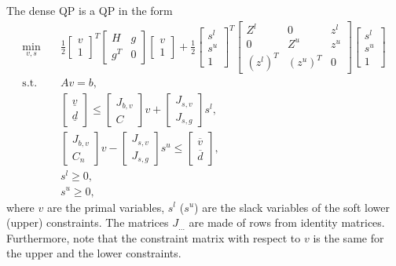 \documentclass[a4paper]{report}
\begin{document}
The dense QP is a QP in the form
\begin{align*}
\min_{v,s} & \quad \frac 1 2 \begin{bmatrix} v \\ 1 \end{bmatrix}^T \begin{bmatrix} H & g \\ g^T & 0 \end{bmatrix} \begin{bmatrix} v \\ 1 \end{bmatrix} + \frac 1 2 \begin{bmatrix} s^l \\ s^u \\ 1 \end{bmatrix}^T \begin{bmatrix} Z^l & 0 & z^l \\ 0 & Z^u & z^u \\ (z^l)^T & (z^u)^T & 0 \end{bmatrix} \begin{bmatrix} s^l \\ s^u \\ 1 \end{bmatrix} \\
\text{s.t.} & \quad A v = b, \\
& \quad \begin{bmatrix} \underline v \\ \underline d \end{bmatrix} \leq \begin{bmatrix} J_{b,v} \\ C \end{bmatrix} v + \begin{bmatrix} J_{s,v} \\ J_{s,g} \end{bmatrix} s^l, \\
& \quad \begin{bmatrix} J_{b,v} \\ C_n \end{bmatrix} v - \begin{bmatrix} J_{s,v} \\ J_{s,g} \end{bmatrix} s^u \leq \begin{bmatrix} \overline v \\ \overline d \end{bmatrix}, \\
& \quad s^l\geq 0, \\
& \quad s^u\geq 0,
\end{align*}
where $v$ are the primal variables, $s^l$ ($s^u$) are the slack variables of the soft lower (upper) constraints.
The matrices $J_{\dots}$ are made of rows from identity matrices.
Furthermore, note that the constraint matrix with respect to $v$ is the same for the upper and the lower constraints.
\end{document}

